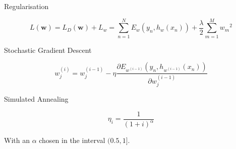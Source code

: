 \begin{frame}{Regularisation}

\[ L(\mathbf{w})
  = L_D(\mathbf{w}) + L_w 
  = \sum_{n=1}^N E_w(y_n, h_w(x_n)) + \frac{\lambda}{2} \sum_{m=1}^{M} {w_m}^2 \] 

\end{frame}

\begin{frame}{Stochastic Gradient Descent}

\[ w_j^{(i)} = w_j^{(i-1)} - \eta \frac{\partial E_{w^{(i-1)}}(y_n, h_{w^{(i-1)}}(x_n))}{\partial w_j^{(i-1)}} \]

\end{frame}


\begin{frame}{Simulated Annealing}

$$\eta_i = \frac{1}{(1+i)^\alpha}$$


With an $\alpha$ chosen in the interval $(0.5,1]$. 

\end{frame}




